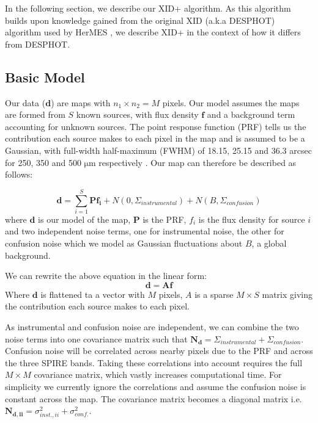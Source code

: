 \documentclass[useAMS,usenatbib]{mnras}
\begin{document}
In the following section, we describe our \textsc{XID+} algorithm. As this algorithm builds upon knowledge gained from the original XID (a.k.a \textsc{DESPHOT}) algorithm used by HerMES \citep{Roseboom:2010, Roseboom:2011, Wang:2014}, we describe XID+ in the context of how it differs from \textsc{DESPHOT}. 


\subsection{Basic Model}
Our data ($\mathbf{d}$) are maps with $n_1 \times n_2 = M$ pixels. Our model assumes the maps are formed from $S$ known sources, with flux density $\mathbf{f}$ and a background term accounting for unknown sources. The point response function (PRF) tells us the contribution each source makes to each pixel in the map and is assumed to be a Gaussian, with full-width half-maximum (FWHM) of 18.15, 25.15 and 36.3 arcsec for 250, 350 and 500 $\mathrm{\mu m}$ respectively \citep{Griffin:2010}. Our map can therefore be described as follows:

\begin{equation}
\mathbf{d} = \sum\limits_{i=1}^S \mathbf{P f_i} + N(0,\Sigma_{instrumental}) + N(B,\Sigma_{confusion})
\label{eq:map}
\end{equation}
where $\mathbf{d}$ is our model of the map, $\mathbf{P}$ is the PRF, $f_i$ is the flux density for source $i$ and two independent noise terms, one for instrumental noise, the other for confusion noise which we model as Gaussian fluctuations about $B$, a global background.

We can rewrite the above equation in the linear form:
\begin{equation}
\mathbf{d} = \mathbf{Af}
\label{eq:map2}
\end{equation}
Where $\mathbf{d}$ is flattened ta a vector with $M$ pixels, $A$ is a sparse $M \times S$ matrix giving the contribution each source makes to each pixel.

As instrumental and confusion noise are independent, we can combine the two noise terms into one covariance matrix such that $\mathbf{N_d} = \Sigma_{instrumental}+\Sigma_{confusion}$. Confusion noise will be correlated across nearby pixels due to the PRF and across the three SPIRE bands. Taking these correlations into account requires the full $M \times M$ covariance matrix, which vastly increases computational time. For simplicity we currently ignore the correlations and assume the confusion noise is constant across the map. The covariance matrix becomes a diagonal matrix i.e. $\mathbf{N_{d,ii}} =\sigma_{inst.,ii}^2+\sigma_{conf.}^2$. 
\end{document}
